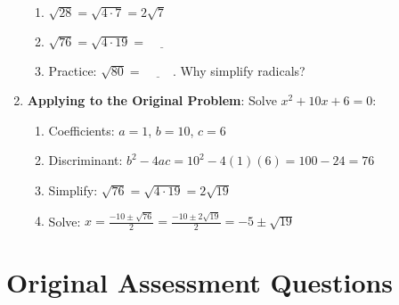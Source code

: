 \documentclass[12pt]{article}
\begin{document}
\begin{enumerate}[label=25.\arabic*]
\begin{enumerate}[label=\alph*)]
        \item \( \sqrt{28} = \sqrt{4 \cdot 7} = 2\sqrt{7} \)
        \item \( \sqrt{76} = \sqrt{4 \cdot 19} = \underline{\hspace{1cm}} \)
        \item Practice: \( \sqrt{80} = \underline{\hspace{1cm}} \). Why simplify radicals? \underline{\hspace{5cm}}
    \end{enumerate}
    \item \textbf{Applying to the Original Problem}: Solve \( x^2 + 10x + 6 = 0 \):
    \begin{enumerate}[label=\alph*)]
        \item Coefficients: \( a = 1 \), \( b = 10 \), \( c = 6 \)
        \item Discriminant: \( b^2 - 4ac = 10^2 - 4(1)(6) = 100 - 24 = 76 \)
        \item Simplify: \( \sqrt{76} = \sqrt{4 \cdot 19} = 2\sqrt{19} \)
        \item Solve: \( x = \frac{-10 \pm \sqrt{76}}{2} = \frac{-10 \pm 2\sqrt{19}}{2} = -5 \pm \sqrt{19} \)
    \end{enumerate}
\end{enumerate}

\section*{Original Assessment Questions}
\end{document}
